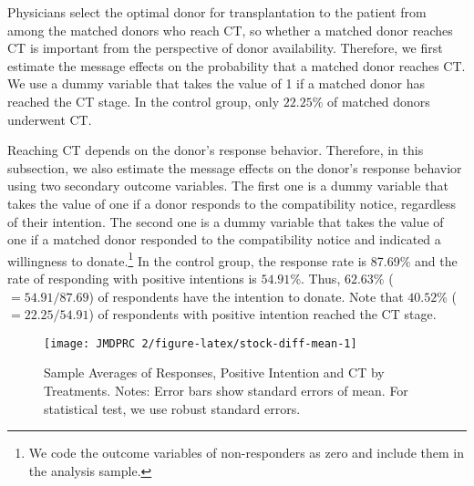 \documentclass[12pt, a4paper]{article}
\begin{document}
Physicians select the optimal donor for transplantation to the patient from among the matched donors who reach CT, so whether a matched donor reaches CT is important from the perspective of donor availability. Therefore, we first estimate the message effects on the probability that a matched donor reaches CT. We use a dummy variable that takes the value of 1 if a matched donor has reached the CT stage. In the control group, only \(22.25\)\% of matched donors underwent CT.

Reaching CT depends on the donor's response behavior. Therefore, in this subsection, we also estimate the message effects on the donor's response behavior using two secondary outcome variables. The first one is a dummy variable that takes the value of one if a donor responds to the compatibility notice, regardless of their intention. The second one is a dummy variable that takes the value of one if a matched donor responded to the compatibility notice and indicated a willingness to donate.\footnote{We code the outcome variables of non-responders as zero and include them in the analysis sample.} In the control group, the response rate is 87.69\% and the rate of responding with positive intentions is \(54.91\)\%. Thus, \(62.63\)\% (\(=54.91/87.69\)) of respondents have the intention to donate. Note that \(40.52\)\% (\(=22.25/54.91\)) of respondents with positive intention reached the CT stage.

\begin{figure}[t]
\texttt{[image: JMDPRC~2/figure-latex/stock-diff-mean-1]} \caption{Sample Averages of Responses, Positive Intention and CT by Treatments. Notes: Error bars show standard errors of mean. For statistical test, we use robust standard errors.}\label{fig:stock-diff-mean}
\end{figure}
\end{document}
